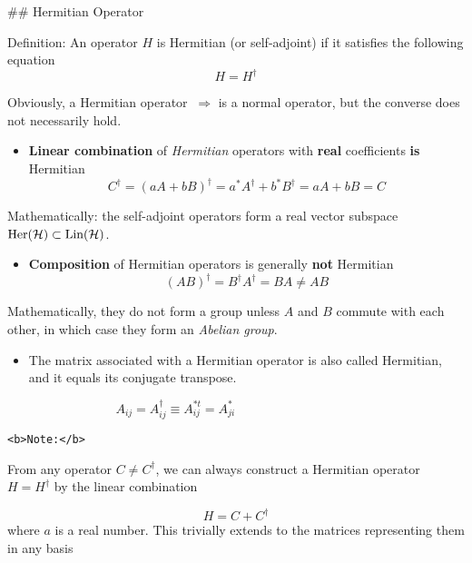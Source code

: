 \documentclass[11pt]{article}
\providecommand{\tightlist}{%
      \setlength{\itemsep}{0pt}\setlength{\parskip}{0pt}}
\begin{document}
    \#\# Hermitian Operator

Definition: An operator \(H\) is Hermitian (or self-adjoint) if it
satisfies the following equation \\
\[
H = H^\dagger 
\]

    Obviously, a Hermitian operator \(~\Rightarrow\) is a normal operator,
but the converse does not necessarily hold.

    \begin{itemize}
\tightlist
\item
  \textbf{Linear combination} of \emph{Hermitian} operators with
  \textbf{real} coefficients \textbf{is} Hermitian\\
  \[
  C^\dagger = (a A + b B)^\dagger = a^* A^\dagger + b^* B^\dagger = aA + b B = C
  \]
\end{itemize}

    Mathematically: the self-adjoint operators form a real vector subspace
\(\mathrm{Her}({\cal H}) \subset \hbox{Lin}({\cal H})\).

    \begin{itemize}
\tightlist
\item
  \textbf{Composition} of Hermitian operators is generally \textbf{not}
  Hermitian\\
  \[
  (AB)^\dagger = B^\dagger A^\dagger = BA \neq AB
  \]
\end{itemize}

    Mathematically, they do not form a group unless \(A\) and \(B\) commute
with each other, in which case they form an \emph{Abelian group}.

    \begin{itemize}
\tightlist
\item
  The matrix associated with a Hermitian operator is also called
  Hermitian, and it equals its conjugate transpose.
\end{itemize}

\[
A_{ij} = A^\dagger_{ij} \equiv  A^{*t}_{ij} = A^*_{ji}   \hspace{4cm}
\]

    \begin{verbatim}
<b>Note:</b>
\end{verbatim}

From any operator \(C \neq C^\dagger\), we can always construct a
Hermitian operator \(H = H^\dagger\) by the linear combination

\[
H = C + C^\dagger
\] where \(a\) is a real number. This trivially extends to the matrices
representing them in any basis
\end{document}
